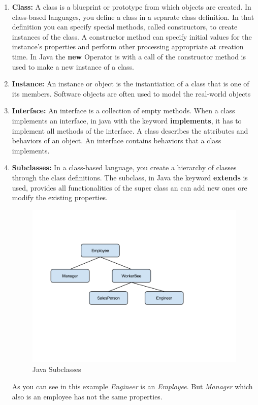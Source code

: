\begin{enumerate}
\item \textbf{Class:} A class is a blueprint or prototype from which objects are created. \cite{javaOBjectOracle} In class-based languages, you define a class in a separate class definition. In that definition you can specify special methods, called constructors, to create instances of the class. A constructor method can specify initial values for the instance's properties and perform other processing appropriate at creation time.\cite{javaObjectClass} In Java the \textbf{new} Operator is with a call of the constructor method is used to make a new instance of a class. 


\item \textbf{Instance:} An instance or object is the instantiation of a class that is one of its members. Software objects are often used to model the real-world objects

\item \textbf{Interface:} An interface is a collection of empty methods. When a class implements an interface, in java with the keyword \textbf{implements}, it has to implement all methods of the interface. A class describes the attributes and behaviors of an object. An interface contains behaviors that a class implements. 

\item \textbf{Subclasses:} In a class-based language, you create a hierarchy of classes through the class definitions.\cite{javaObjectClass} The subclass, in Java the keyword \textbf{extends} is used, provides all functionalities of the super class an can add new ones ore modify the existing properties.

\begin{figure}[H]
\centering
\includegraphics[width=1.0\linewidth]{graphics/java_subclass.PNG}
\caption{Java Subclasses}
\end{figure}
As you can see in this example \textit{Engineer} is an \textit{Employee}. But \textit{Manager} which also is an employee has not the same properties. 



\end{enumerate}

